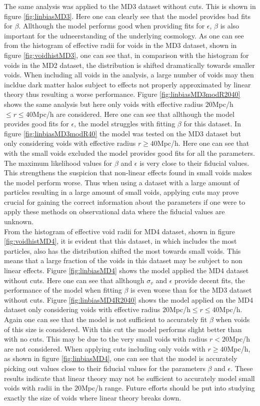 The same analysis was applied to the MD3 dataset without cuts. This is shown in figure \ref{fig:linbiasMD3}. Here one can clearly see that the model provides bad fits for $\beta$. Allthough the model performs good when providing fits for $\epsilon$, $\beta$ is also important for the udneerstanding of the underlying cosmology. As one can see from the histogram of effective radii for voids in the MD3 dataset, shown in figure \ref{fig:voidhistMD3}, one can see that, in comparison with the histogram for voids in the MD2 dataset, the distribution is shifted dramatically towards smaller voids. When including all voids in the analysis, a large number of voids may then incldue dark matter halos subject to effects not properly approximated by linear theory thus resulting a worse performance. Figure \ref{fig:linbiasMD3modR2040} shows the same analysis but here only voids with effective radius $20$Mpc/h$\leq r\leq 40$Mpc/h are considered. Here one can see that allthough the model provides good fits for $\epsilon$, the model struggles with fitting $\beta$ for this dataset. In figure \ref{fig:linbiasMD3modR40} the model was tested on the MD3 dataset but only considering voids with effective radius $r\geq 40$Mpc/h. Here one can see that with the small voids excluded the model provides good fits for all the parameters. The maximum likelihood values for $\beta$ and $\epsilon$ is very close to their fiducial values. This strengthens the suspicion that non-linear effects found in small voids makes the model perform worse. Thus when using a dataset with a large amount of particles resulting in a large amount of small voids, applying cuts may prove crucial for gaining the correct information about the parameters if one were to apply these methods on observational data where the fiducial values are unknown. \\\indent
From the histogram of effective void radii for MD4 dataset, shown in figure \ref{fig:voidhistMD4}, it is evident that this dataset, in which includes the most particles, also has the distribution shifted the most towards small voids. This means that a large fraction of the voids in this dataset may be subject to non linear effects. Figure \ref{fig:linbiasMD4} shows the model applied the MD4 dataset without cuts. Here one can see that allthough $\sigma_v$ and $\epsilon$ provide decent fits, the performance of the model when fitting $\beta$ is even worse than for the MD3 dataset without cuts. Figure \ref{fig:linbiasMD4R2040} shows the model applied on the MD4 dataset only considering voids with effective radius $20$Mpc/h$\leq r\leq 40$Mpc/h. Again one can see that the model is not sufficient to accurately fit $\beta$ when voids of this size is considered. With this cut the model performs slight better than with no cuts. This may be due to the very small voids with radius $r< 20$Mpc/h are not considered. When applying cuts including only voids with $r\geq 40$Mpc/h, as shown in figure \ref{fig:linbiasMD4}, one can see that the model is accurately picking out values close to their fiducial values for the parameters $\beta$ and $\epsilon$. These results indicate that linear theory may not be sufficient to accurately model small voids with radii in the $20$Mpc/h range. Future efforts should be put into studying exactly the size of voids where linear theory breaks down.  

